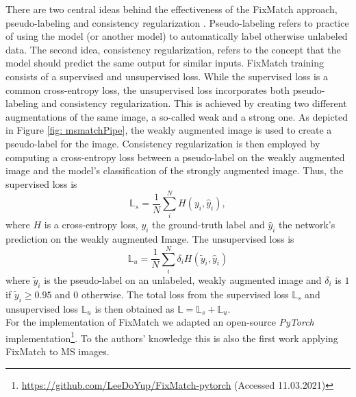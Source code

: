 \documentclass[journal]{IEEEtran}
\begin{document}
There are two central ideas behind the effectiveness of the FixMatch approach, pseudo-labeling and consistency regularization \cite{bachman2014,kurakin2020}. Pseudo-labeling refers to practice of using the model (or another model) to automatically label otherwise unlabeled data. The second idea, consistency regularization, refers to the concept that the model should predict the same output for similar inputs. FixMatch training consists of a supervised and unsupervised loss. While the supervised loss is a common cross-entropy loss, the unsupervised loss incorporates both pseudo-labeling and consistency regularization.
This is achieved by creating two different augmentations of the same image, a so-called weak and a strong one. As depicted in Figure \ref{fig: msmatchPipe}, the weakly augmented image is used to create a pseudo-label for the image. Consistency regularization is then employed by computing a cross-entropy loss between a pseudo-label on the weakly augmented image and the model's classification of the strongly augmented image.
Thus, the supervised loss is
\begin{equation}
    \mathbb{L}_s = \frac{1}{N}\sum_i^N  H(y_i, \hat{y}_i),
\end{equation}
where $H$ is a cross-entropy loss, $y_i$ the ground-truth label and $\hat{y}_i$ the network's prediction on the weakly augmented Image. The unsupervised loss is
\begin{equation}
    \mathbb{L}_u = \frac{1}{N}\sum_i^N \delta_i H(\tilde{y}_i, \hat{y}_i)
\end{equation}
where $\tilde{y}_i$ is the pseudo-label on an unlabeled, weakly augmented image and $\delta_i$ is $1$ if $\tilde{y}_i \geq 0.95$ and $0$ otherwise.
The total loss from the supervised loss $\mathbb{L}_s$ and unsupervised loss $\mathbb{L}_u$ is then obtained as $\mathbb{L} = \mathbb{L}_s + \mathbb{L}_u$. \\
For the implementation of FixMatch we adapted an open-source \textit{PyTorch} implementation\footnote{\url{https://github.com/LeeDoYup/FixMatch-pytorch} (Accessed 11.03.2021)}. To the authors' knowledge this is also the first work applying FixMatch to MS images.
\end{document}

